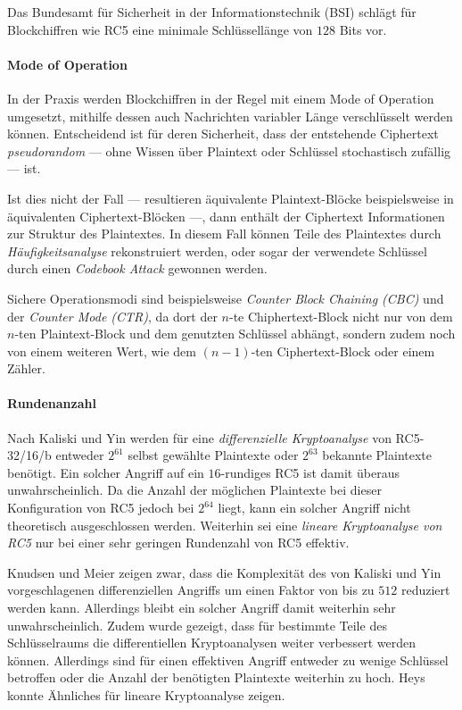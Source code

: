 \documentclass[course=erap]{aspdoc}
\begin{document}
Das Bundesamt für Sicherheit in der Informationstechnik (BSI) schlägt für Blockchiffren wie RC5 eine minimale Schlüssellänge von $128$ Bits vor.\cite[p.21]{bsi}

\paragraph{Mode of Operation} In der Praxis werden Blockchiffren in der Regel mit einem Mode of Operation umgesetzt, mithilfe dessen auch Nachrichten variabler Länge verschlüsselt werden können. Entscheidend ist für deren Sicherheit, dass der entstehende Ciphertext \textit{pseudorandom} --- ohne Wissen über Plaintext oder Schlüssel stochastisch zufällig\cite{pseudorandomness} --- ist.\bigbreak

Ist dies nicht der Fall --- resultieren äquivalente Plaintext-Blöcke beispielsweise in äquivalenten Ciphertext-Blöcken ---, dann enthält der Ciphertext Informationen zur Struktur des Plaintextes\cite[p.22]{bsi}. In diesem Fall können Teile des Plaintextes durch \textit{Häufigkeitsanalyse} rekonstruiert werden\cite[p.22]{bsi}, oder sogar der verwendete Schlüssel durch einen \textit{Codebook Attack} gewonnen werden\cite[p.2]{elbaz}.\bigbreak

Sichere Operationsmodi sind beispielsweise \textit{Counter Block Chaining (CBC)} und der \textit{Counter Mode (CTR)}, da dort der $n$-te Chiphertext-Block nicht nur von dem $n$-ten Plaintext-Block und dem genutzten Schlüssel abhängt, sondern zudem noch von einem weiteren Wert, wie dem $(n-1)$-ten Ciphertext-Block oder einem Zähler.\cite[p.22]{bsi}

\paragraph{Rundenanzahl} Nach Kaliski und Yin werden für eine \textit{differenzielle Kryptoanalyse} von RC5-32/16/b entweder $2^{61}$ selbst gewählte Plaintexte oder $2^{63}$ bekannte Plaintexte benötigt. Ein solcher Angriff auf ein $16$-rundiges RC5 ist damit überaus unwahrscheinlich. Da die Anzahl der möglichen Plaintexte bei dieser Konfiguration von RC5 jedoch bei $2^{64}$ liegt, kann ein solcher Angriff nicht theoretisch ausgeschlossen werden.\cite[p.6]{kaliski+yin} Weiterhin sei eine \textit{lineare Kryptoanalyse von RC5} nur bei einer sehr geringen Rundenzahl von RC5 effektiv.\cite[p.28]{kaliski+yin}\bigbreak

Knudsen und Meier zeigen zwar, dass die Komplexität des von Kaliski und Yin vorgeschlagenen differenziellen Angriffs um einen Faktor von bis zu $512$ reduziert werden kann.\cite[p.2]{knudsen+meier} Allerdings bleibt ein solcher Angriff damit weiterhin sehr unwahrscheinlich. Zudem wurde gezeigt, dass für bestimmte Teile des Schlüsselraums die differentiellen Kryptoanalysen weiter verbessert werden können.\cite[p.13]{knudsen+meier} Allerdings sind für einen effektiven Angriff entweder zu wenige Schlüssel betroffen oder die Anzahl der benötigten Plaintexte weiterhin zu hoch. Heys konnte Ähnliches für lineare Kryptoanalyse zeigen.\cite[p.5]{heys}\bigbreak
\end{document}

